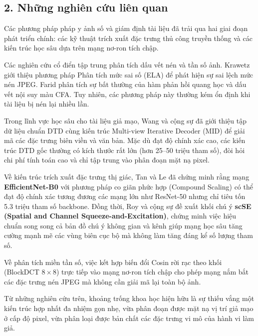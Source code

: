 \subsection{2. Những nghiên cứu liên quan}

\indent\indent Các phương pháp pháp y ảnh số và giám định tài liệu đã trải qua hai giai đoạn phát triển chính: các kỹ thuật trích xuất đặc trưng thủ công truyền thống và các kiến trúc học sâu dựa trên mạng nơ-ron tích chập.

Các nghiên cứu cổ điển tập trung phân tích dấu vết nén và tần số ảnh. Krawetz \cite{krawetz2007picture} giới thiệu phương pháp Phân tích mức sai số (ELA) để phát hiện sự sai lệch mức nén JPEG. Farid \cite{farid2009image} phân tích sự bất thường của hàm phản hồi quang học và dấu vết nội suy màu CFA. Tuy nhiên, các phương pháp này thường kém ổn định khi tài liệu bị nén lại nhiều lần.\vspace{0.3cm}

Trong lĩnh vực học sâu cho tài liệu giả mạo, Wang và cộng sự \cite{dtd_dataset} đã giới thiệu tập dữ liệu chuẩn DTD cùng kiến trúc Multi-view Iterative Decoder (MID) để giải mã các đặc trưng biên viền và văn bản. Mặc dù đạt độ chính xác cao, các kiến trúc DTD gốc thường có kích thước rất lớn (hơn 25--50 triệu tham số), đòi hỏi chi phí tính toán cao và chỉ tập trung vào phân đoạn mặt nạ pixel.\vspace{0.3cm}

Về kiến trúc trích xuất đặc trưng thị giác, Tan và Le \cite{tan2019efficientnet} đã chứng minh rằng mạng \textbf{EfficientNet-B0} với phương pháp co giãn phức hợp (Compound Scaling) có thể đạt độ chính xác tương đương các mạng lớn như ResNet-50 \cite{he2015deepresiduallearningimage} nhưng chỉ tiêu tốn 5.3 triệu tham số backbone. Đồng thời, Roy và cộng sự \cite{roy2018concurrent} đề xuất khối chú ý \textbf{scSE (Spatial and Channel Squeeze-and-Excitation)}, chứng minh việc hiệu chuẩn song song cả bản đồ chú ý không gian và kênh giúp mạng học sâu tăng cường mạnh mẽ các vùng biên cục bộ mà không làm tăng đáng kể số lượng tham số.\vspace{0.3cm}

Về phân tích miền tần số, việc kết hợp biến đổi Cosin rời rạc theo khối (BlockDCT $8 \times 8$) trực tiếp vào mạng nơ-ron tích chập \cite{ahmed1974discrete} cho phép mạng nắm bắt các đặc trưng nén JPEG mà không cần giải mã lại toàn bộ ảnh.

Từ những nghiên cứu trên, khoảng trống khoa học hiện hữu là sự thiếu vắng một kiến trúc hợp nhất đa nhiệm gọn nhẹ, vừa phân đoạn được mặt nạ vị trí giả mạo ở cấp độ pixel, vừa phân loại được bản chất các đặc trưng vi mô của hành vi làm giả.
